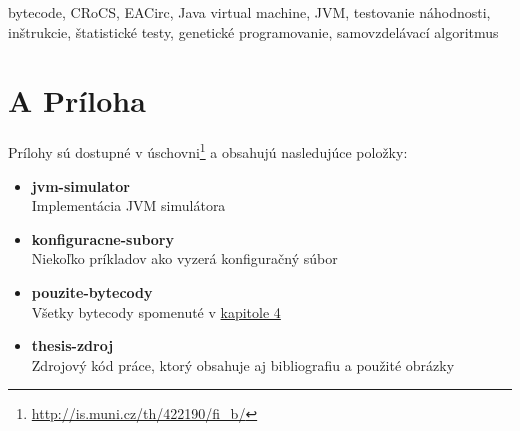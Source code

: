 \documentclass[12pt,twoside]{fithesis2}
\renewcommand{\_}{\leavevmode \kern0.0em\vbox{\hrule width0.4em}}
\newcommand{\squarebullet}{\textcolor{black}{\raisebox{0.15em}{\rule{4pt}{4pt}}}}
\newenvironment{myItemize}{
  \begin{itemize}[leftmargin=2em,rightmargin=1em,itemsep=0.75\parskip,parsep=0em,topsep=0em,partopsep=0em]
  \renewcommand{\labelitemi}{\squarebullet}
  \renewcommand{\labelitemii}{$\diamond$}
}{
  \end{itemize}
}
\begin{document}
\begin{ThesisKeyWords}
bytecode, CRoCS, EACirc, Java virtual machine, JVM, testovanie náhodnosti, inštrukcie, štatistické testy, genetické programovanie, samovzdelávací algoritmus
\end{ThesisKeyWords}




\MainMatter
\tableofcontents









\appendix

\nocite{*}
\printbibliography[title={Bibliografia}]

\chapter*{A Príloha}
\label{chap:attachments}

Prílohy sú dostupné v úschovni\footnote{\url{http://is.muni.cz/th/422190/fi_b/}} a obsahujú nasledujúce položky:
\begin{myItemize}
	\item \textbf{jvm-simulator}\\Implementácia JVM simulátora
	\item \textbf{konfiguracne-subory}\\Niekoľko príkladov ako vyzerá konfiguračný súbor
	\item \textbf{pouzite-bytecody}\\Všetky bytecody spomenuté v \hyperref[chap:experiments]{kapitole 4}
	\item \textbf{thesis-zdroj}\\Zdrojový kód práce, ktorý obsahuje aj bibliografiu a použité obrázky
\end{myItemize}
\end{document}
